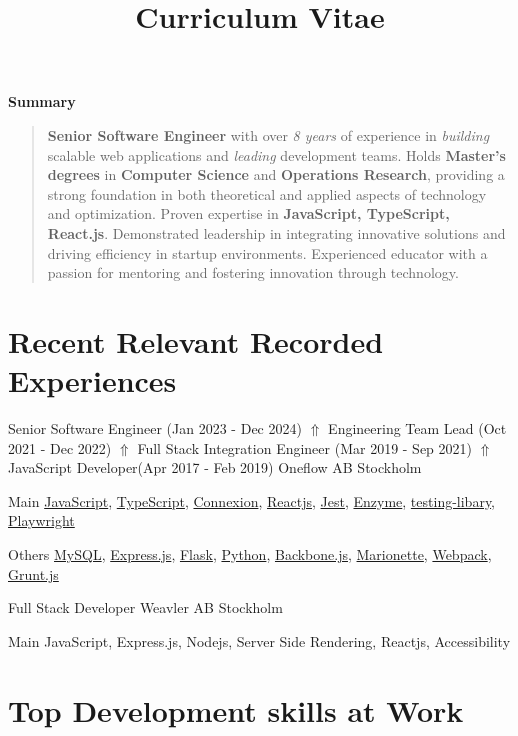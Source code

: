 \documentclass[13.12pt,a4paper,sans,colorlinks,hyperindex,plainpages=false,bookmarksopen,bookmarksnumbered,pdfusetitle]{moderncv}
\title{Curriculum Vitae}
\newcommand{\cvsummary}[1]{
  \vspace{1em}
  \par\noindent\textbf{\large Summary}\par
  \vspace{0.5em}
  \begin{quote}
    \small #1
  \end{quote}
  \vspace{1em}
}
\newcommand{\badge}[2]{
  \colorbox{#1}{\hspace{0.1em} #2 \hspace{0.1em}}
}
\newcommand{\mainTech}[1]{
  \begin{flushleft}{\badge{flashyGreen}{Main} #1}\end{flushleft}
}
\newcommand{\techStackList}[1]{
  \begin{flushleft}{\badge{queenPink}{Others} #1}\end{flushleft}
}
\begin{document}
\makecvtitle
\vspace{-1.8em}

\cvsummary{
  \textbf{Senior Software Engineer} with over \textit{8 years} of experience in \textit{building} scalable web applications and \textit{leading} development teams.
  Holds \textbf{Master's degrees} in \textbf{Computer Science} and \textbf{Operations Research}, providing a strong foundation in both theoretical and applied aspects of technology and optimization.
  Proven expertise in \textbf{JavaScript, TypeScript, React.js}. Demonstrated leadership in integrating innovative solutions and driving efficiency in startup environments.
  Experienced educator with a passion for mentoring and fostering innovation through technology.
}

\section{Recent Relevant Recorded Experiences}
{Senior Software Engineer (Jan 2023 - Dec 2024)  \(\Uparrow\) Engineering Team Lead (Oct 2021 - Dec 2022) \(\Uparrow\) Full Stack Integration Engineer (Mar 2019 - Sep 2021)  \(\Uparrow\) JavaScript Developer(Apr 2017 - Feb 2019)}
{Oneflow AB}
{Stockholm \Large{}}{}
{
  \mainTech{\href{https://tc39.es/ecma262/}{JavaScript}, \href{https://www.typescriptlang.org/}{TypeScript}, \href{https://github.com/spec-first/connexion}{Connexion}, \href{https://react.dev/}{Reactjs}, \href{https://jestjs.io/}{Jest}, \href{https://enzymejs.github.io/enzyme/}{Enzyme}, \href{https://testing-library.com/}{testing-libary}, \href{https://playwright.dev/}{Playwright}}
  \techStackList{\href{https://www.mysql.com/}{MySQL}, \href{https://expressjs.com/}{Express.js}, \href{https://flask.palletsprojects.com/en/3.0.x/}{Flask}, \href{https://www.python.org/}{Python},  \href{https://backbonejs.org/}{Backbone.js}, \href{https://marionettejs.com/}{Marionette}, \href{https://webpack.js.org/}{Webpack}, \href{https://gruntjs.com/}{Grunt.js}}
}

\vspace{1em}

{Full Stack Developer}
{Weavler AB}
{Stockholm \Large{}}{}
{\mainTech{JavaScript, Express.js, Nodejs, Server Side Rendering, Reactjs, Accessibility}}

\section{Top Development skills at \textbf{Work}}
\end{document}
